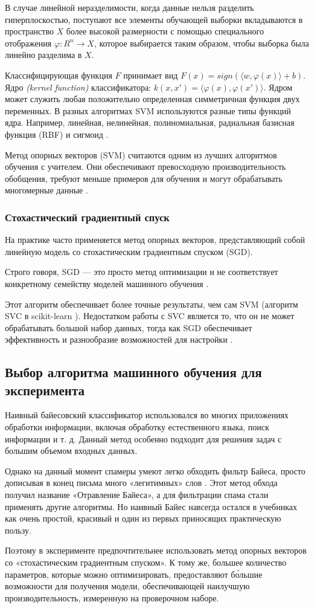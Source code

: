 В случае линейной неразделимости, когда данные нельзя разделить гиперплоскостью, поступают
все элементы обучающей выборки вкладываются в пространство $X$ более высокой размерности с
помощью специального отображения $\varphi : R^n \rightarrow X$, которое выбирается таким образом,
чтобы выборка была линейно разделима в $X$.

Классифицирующая функция $F$ принимает вид $F(x)=sign(\langle w, \varphi (x) \rangle + b)$.
Ядро \emph{(kernel function)} классификатора: $k(x, x') = \langle \varphi (x), \varphi (x') \rangle $.
Ядром может служить любая положительно определенная симметричная функция двух переменных.
В разных алгоритмах SVM используются разные типы функций ядра. Например, линейная, нелинейная,
полиномиальная, радиальная базисная функция (RBF) и сигмоид \cite{SVM}.

Метод опорных векторов (SVM) считаются одним из лучших алгоритмов обучения
с учителем. Они обеспечивают превосходную производительность обобщения, требуют
меньше примеров для обучения и могут обрабатывать многомерные данные \cite{scikitSGD}.

\subsubsection{Стохастический градиентный спуск}\label{SGD}
На практике часто применяется метод опорных векторов, представляющий собой
линейную модель со стохастическим градиентным спуском (SGD).

Строго говоря, SGD — это просто метод оптимизации и не соответствует
конкретному семейству моделей машинного обучения \cite{IEEE}.

Этот алгоритм обеспечивает более точные результаты, чем сам SVM (алгоритм SVC в scikit-learn \cite{SVC}).
Недостатком работы с SVC является то, что он не может обрабатывать большой
набор данных, тогда как SGD обеспечивает эффективность и разнообразие
возможностей для настройки \cite{scikitSGD}.

\subsection{Выбор алгоритма машинного обучения для эксперимента}
Наивный байесовский классификатор использовался во многих приложениях обработки
информации, включая обработку естественного языка, поиск информации и т. д.
Данный метод особенно подходит для решения задач с большим объемом входных данных.

Однако на данный момент спамеры умеют легко обходить фильтр Байеса, просто дописывая в
конец письма много «легитимных» слов \cite{filters}. Этот метод обхода получил название «Отравление Байеса»,
а для фильтрации спама стали применять другие алгоритмы. Но наивный Байес навсегда остался
в учебниках как очень простой, красивый и один из первых приносящих практическую пользу.

Поэтому в эксперименте предпочтительнее использовать метод опорных векторов
со «стохастическим градиентным спуском». К тому же, большее количество параметров,
которые можно оптимизировать, предоставляют бо́льшие возможности для получения модели,
обеспечивающей наилучшую производительность, измеренную на проверочном наборе.

